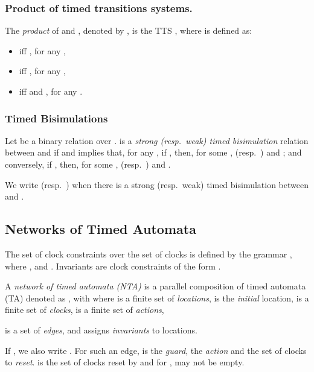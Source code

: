 \documentclass{LMCS}
\theoremstyle{plain}\newtheorem*{prop11}{Proposition~\ref{prop:states} bis}
\begin{document}
\subsubsection*{Product of timed transitions systems.}
The \emph{product} of  and , denoted by , is the TTS
\mbox{},
where  is defined as:
\begin{itemize}
  \item  iff ,
  for any ,
  \item  iff ,
  for any ,
  \item  iff 
  and , for any .
\end{itemize}


\subsubsection*{Timed Bisimulations}
Let  be a binary relation over .
 is a
\emph{strong (resp.\ weak) timed bisimulation} relation between  and  if
 and  implies that, for any
,
if , then, for some ,
   (resp.\ ) and
  ;
  and conversely, if , then, for some ,
   (resp.\ ) and .


We write  (resp.\ ) when there is a strong (resp.\ weak)
timed bisimulation between  and .

\subsection{Networks of Timed Automata}
The set  of clock constraints over the set of clocks  is
defined by the grammar , where ,
 and . Invariants are clock
constraints of the form .
\begin{defi} A \emph{network of timed automata (NTA)} \cite{AD94} is a parallel composition
  of timed automata (TA) denoted as \mbox{},
  with  where
   is a finite set of \emph{locations},
   is the \emph{initial} location,
   is a finite set of \emph{clocks},
   is a finite set of \emph{actions},
  
  is a set of \emph{edges},
  and  assigns \emph{invariants}
  to locations.
\end{defi}
If , we also write .
For such an edge,  is the \emph{guard},  the \emph{action} and  the set of clocks to \emph{reset}.
 is the set
of clocks reset by  and for ,  may not be
empty.
\end{document}
